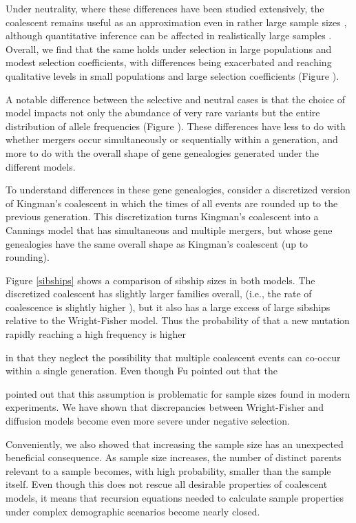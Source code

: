 \documentclass[review,nonatbib]{elsarticle}
\begin{document}
Under neutrality, where these differences have been studied extensively, the coalescent remains useful 
as an approximation even in rather large sample sizes \cite{Fu2006}, although quantitative inference 
can be affected in realistically large samples \cite{BhaskarEtAl2014}. Overall, we find that the same holds under selection in 
large populations and modest selection coefficients, with differences being exacerbated and 
reaching qualitative levels in small populations and large selection coefficients (Figure \cite{}). 
 
 A notable difference between the selective and neutral cases is that the choice of model impacts
 not only the abundance of very rare variants but the entire distribution of allele frequencies (Figure \cite{}). 
 These differences have less to do with whether mergers occur simultaneously or sequentially within a 
 generation, and more to do with the overall shape of gene genealogies generated under the different
  models. 
 
To understand differences in these gene genealogies, consider a discretized 
version of Kingman's coalescent in which the times of all events are rounded up to the previous generation. 
This discretization turns Kingman's coalescent into a Cannings model that has simultaneous and 
multiple mergers, but whose gene genealogies have the same overall shape as Kingman's coalescent (up to rounding).

Figure \ref{sibships} shows a comparison of sibship sizes in both models. The discretized coalescent has 
slightly larger families overall, (i.e., the rate of coalescence is slightly higher \cite{Fu2006}), but 
it also has a large excess of large sibships relative to the Wright-Fisher model. Thus the probability of that 
a new mutation rapidly reaching a high frequency is higher   

 

in that they neglect the possibility that multiple coalescent events
can co-occur within a single generation. Even though Fu \cite{Fu2006} pointed out that the  

\citep{BhaskarEtAl2014,NelsonEtAl2019} pointed out that this
assumption is problematic for sample sizes found in modern experiments.
We have shown that discrepancies between Wright-Fisher and diffusion models become even more severe 
under negative selection.

Conveniently, we also showed that increasing the sample size has an unexpected beneficial consequence.
As sample size increases, the number of distinct parents relevant to a sample becomes,
with high probability, smaller than the sample itself. Even though this does not rescue
all desirable properties of coalescent models, it means that recursion equations
needed to calculate sample properties under complex demographic scenarios become nearly closed. 
\end{document}
